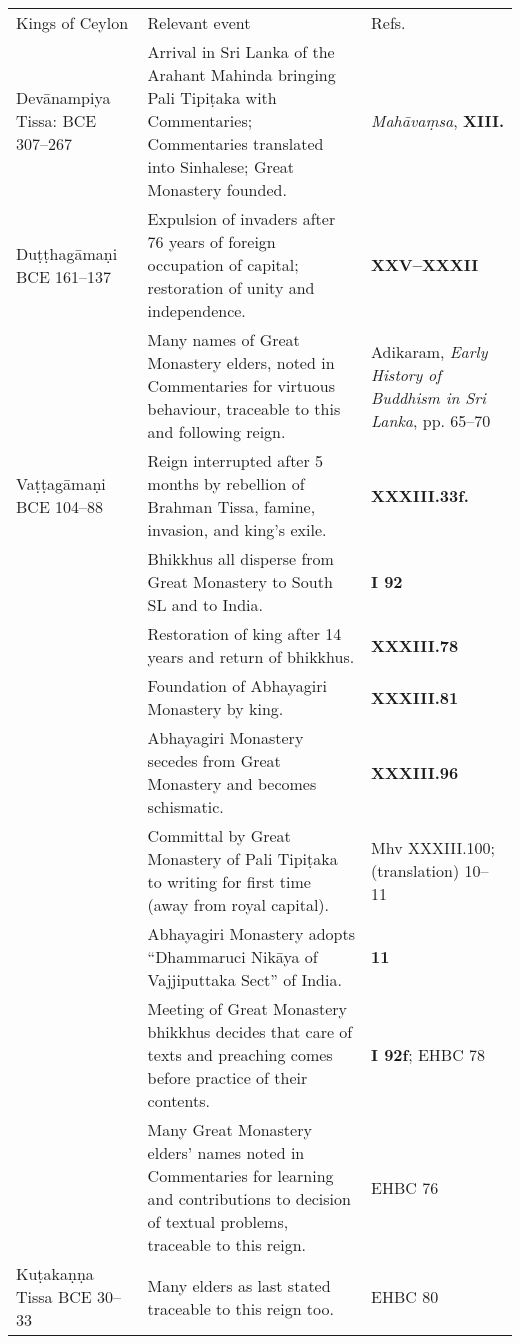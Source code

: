 

\ifplastex
\begin{tabular}{l|l|l}
    Kings of Ceylon & Relevant event & Refs.\\
    Devānampiya Tissa:  BCE 307–267   & Arrival in Sri Lanka of the Arahant Mahinda bringing Pali Tipiṭaka with Commentaries; Commentaries translated into Sinhalese; Great Monastery founded.  & \emph{Mahāvaṃsa}, \textbf{\cite{Mhv} XIII.}  \\
    Duṭṭhagāmaṇi BCE 161–137 & Expulsion of invaders after 76 years of foreign occupation of capital; restoration of unity and independence.   & \textbf{\cite{Mhv} XXV–XXXII} \\
     & Many names of Great Monastery elders, noted in Commentaries for virtuous behaviour, traceable to this and following reign.  & Adikaram, \emph{Early History of Buddhism in Sri Lanka}, pp. 65–70 \\
    Vaṭṭagāmaṇi  BCE 104–88  & Reign interrupted after 5 months by rebellion of Brahman Tissa, famine, invasion, and king’s exile. & \textbf{\cite{Mhv} XXXIII.33f.} \\
     & Bhikkhus all disperse from Great Monastery to South SL and to India.   & \textbf{\cite{A-a} I 92}\\
     & Restoration of king after 14 years and return of bhikkhus. & \textbf{\cite{Mhv} XXXIII.78}\\
     & Foundation of Abhayagiri Monastery by king.  & \textbf{\cite{Mhv} XXXIII.81}  \\
     & Abhayagiri Monastery secedes from Great Monastery and becomes schismatic. & \textbf{\cite{Mhv} XXXIII.96}\\
     & Committal by Great Monastery of Pali Tipiṭaka to writing for first time (away from royal capital).  & Mhv XXXIII.100;  \textbf{\cite{Nikāya-s}} (translation) 10–11  \\
     & Abhayagiri Monastery adopts  “Dhammaruci Nikāya of Vajjiputtaka Sect” of India.  & \textbf{\cite{Nikāya-s} 11}\\
     & Meeting of Great Monastery bhikkhus  decides that care of texts and preaching  comes before practice of their contents.  & \textbf{\cite{A-a} I 92f}; EHBC 78\\
     & Many Great Monastery elders’ names noted  in Commentaries for learning and contributions to decision of textual  problems, traceable to this reign. & EHBC 76 \\
    Kuṭakaṇṇa Tissa BCE 30–33 & Many elders as last stated traceable to this reign too. & EHBC 80 \\

\end{tabular}
